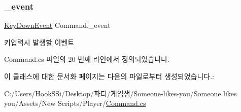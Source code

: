 \subsubsection{\texorpdfstring{\_event}{\_event}}
{\footnotesize\ttfamily \mbox{\hyperlink{class_command_acc714b5e0de57b7f24b2619fff860b9d}{Key\+Down\+Event}} Command.\+\_\+event}



키입력시 발생할 이벤트 



Command.\+cs 파일의 20 번째 라인에서 정의되었습니다.



이 클래스에 대한 문서화 페이지는 다음의 파일로부터 생성되었습니다.\+:\begin{DoxyCompactItemize}
\item 
C\+:/\+Users/\+Hook\+S\+Si/\+Desktop/파티/게임잼/\+Someone-\/likes-\/you/\+Someone likes you/\+Assets/\+New Scripts/\+Player/\mbox{\hyperlink{_command_8cs}{Command.\+cs}}\end{DoxyCompactItemize}
